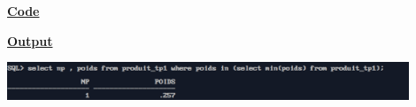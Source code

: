 \newpage
{}

\textbf{\underline{Code}}


\vspace{1cm}
\textbf{\underline{Output}}
\vspace{1cm}
\begin{center}
    \includegraphics[width=0.9\textwidth]{Questions/q34/q34.png}
\end{center}


